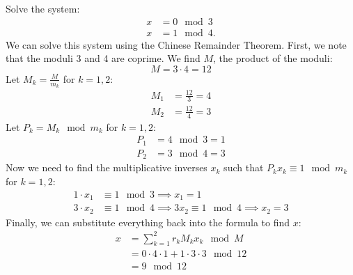 \documentclass[12pt]{exam}
\begin{document}
\begin{questions}
\newpage 
\question 
Solve the system: 
\begin{align*}
x &= 0 \mod 3\\
x &= 1 \mod 4.
\end{align*}
We can solve this system using the Chinese Remainder Theorem.
First, we note that the moduli 3 and 4 are coprime.
We find $M$, the product of the moduli:
\[
M = 3 \cdot 4 = 12
\]
Let $M_k = \frac{M}{m_k}$ for $k=1,2$:
\begin{align*}
M_1 &= \frac{12}{3} = 4\\
M_2 &= \frac{12}{4} = 3
\end{align*}
Let $P_k = M_k \mod m_k$ for $k=1,2$:
\begin{align*}
P_1 &= 4 \mod 3 = 1\\
P_2 &= 3 \mod 4 = 3
\end{align*}
Now we need to find the multiplicative inverses $x_k$ such that $P_k x_k \equiv 1 \mod m_k$ for $k=1,2$:
\begin{align*}
1 \cdot x_1 &\equiv 1 \mod 3 \implies x_1 = 1\\
3 \cdot x_2 &\equiv 1 \mod 4 \implies 3x_2 \equiv 1 \mod 4 \implies x_2 = 3
\end{align*}
Finally, we can substitute everything back into the formula to find $x$:
\begin{align*}
x &= \sum_{k=1}^2 r_k M_k x_k \mod M\\
&= 0 \cdot 4 \cdot 1 + 1 \cdot 3 \cdot 3 \mod 12\\
&= 9 \mod 12
\end{align*}


\end{questions}
\end{document}
